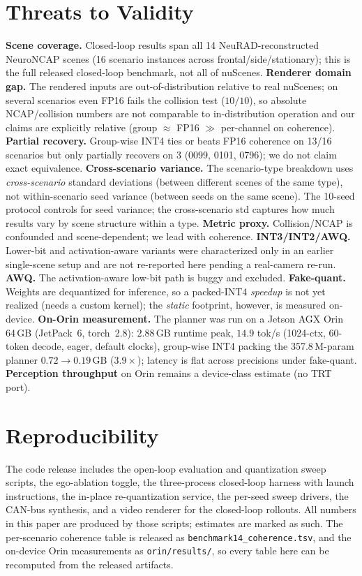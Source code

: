 \documentclass[11pt]{article}
\begin{document}
\section{Threats to Validity}
\textbf{Scene coverage.} Closed-loop results span all 14 NeuRAD-reconstructed NeuroNCAP scenes
(16 scenario instances across frontal/side/stationary); this is the full released closed-loop
benchmark, not all of nuScenes. \textbf{Renderer domain gap.} The rendered inputs are
out-of-distribution relative to real nuScenes; on several scenarios even FP16 fails the collision
test ($10/10$), so absolute NCAP/collision numbers are not comparable to in-distribution operation
and our claims are explicitly relative (group $\approx$ FP16 $\gg$ per-channel on coherence).
\textbf{Partial recovery.} Group-wise INT4 ties or beats FP16 coherence on 13/16 scenarios but only
partially recovers on 3 (0099, 0101, 0796); we do not claim exact equivalence.
\textbf{Cross-scenario variance.} The scenario-type breakdown uses \emph{cross-scenario} standard
deviations (between different scenes of the same type), not within-scenario seed variance (between
seeds on the same scene). The 10-seed protocol controls for seed variance; the cross-scenario std
captures how much results vary by scene structure within a type.
\textbf{Metric proxy.} Collision/NCAP is confounded and scene-dependent; we lead with coherence.
\textbf{INT3/INT2/AWQ.} Lower-bit and activation-aware variants were characterized only in an earlier
single-scene setup and are not re-reported here pending a real-camera re-run.
\textbf{AWQ.} The activation-aware low-bit path is buggy and excluded. \textbf{Fake-quant.} Weights
are dequantized for inference, so a packed-INT4 \emph{speedup} is not yet realized (needs a custom
kernel); the \emph{static} footprint, however, is measured on-device. \textbf{On-Orin measurement.}
The planner was run on a Jetson AGX Orin 64\,GB (JetPack~6, torch~2.8): $2.88$\,GB runtime peak,
$14.9$ tok/s (1024-ctx, 60-token decode, eager, default clocks), group-wise INT4 packing the
357.8\,M-param planner $0.72\to 0.19$\,GB ($3.9\times$); latency is flat across precisions under
fake-quant. \textbf{Perception throughput} on Orin remains a device-class estimate (no TRT port).

\section{Reproducibility}
The code release includes the open-loop evaluation and quantization sweep scripts, the ego-ablation
toggle, the three-process closed-loop harness with launch instructions, the in-place
re-quantization service, the per-seed sweep drivers, the CAN-bus synthesis, and a video renderer for
the closed-loop rollouts. All numbers in this paper are produced by those scripts; estimates are
marked as such. The per-scenario coherence table is released as \texttt{benchmark14\_coherence.tsv},
and the on-device Orin measurements as \texttt{orin/results/}, so every table here can be
recomputed from the released artifacts.
\end{document}

